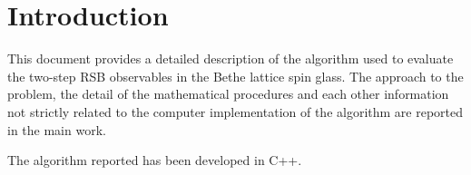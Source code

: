 \chapter{Introduction}

This document provides a detailed description of the algorithm used to evaluate the two-step RSB observables in the Bethe lattice spin glass. The approach to the problem, the detail of the mathematical procedures and each other information not strictly related to the computer implementation of the algorithm are reported in the main work.

The algorithm reported has been developed in C++. 

